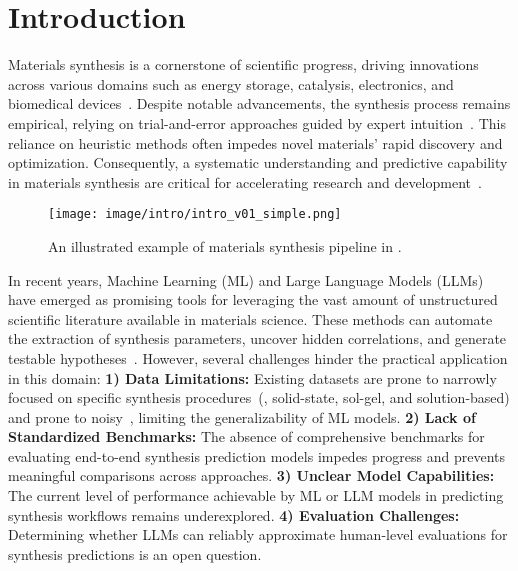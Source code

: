 \section{Introduction}
\label{sec:intro}

Materials synthesis is a cornerstone of scientific progress, driving innovations across various domains such as energy storage, catalysis, electronics, and biomedical devices~\cite{olivetti2020data}. Despite notable advancements, the synthesis process remains empirical, relying on trial-and-error approaches guided by expert intuition~\cite{merchant2023scaling}. This reliance on heuristic methods often impedes novel materials' rapid discovery and optimization. Consequently, a systematic understanding and predictive capability in materials synthesis are critical for accelerating research and development~\cite{huang2023application}.

\begin{figure}[!ht]
    \centering
    \texttt{[image: image/intro/intro\_v01\_simple.png]}
    \caption{An illustrated example of materials synthesis pipeline in \oursbench.}
    \label{fig:intro}
\end{figure}


In recent years, Machine Learning (ML) and Large Language Models (LLMs) have emerged as promising tools for leveraging the vast amount of unstructured scientific literature available in materials science. These methods can automate the extraction of synthesis parameters, uncover hidden correlations, and generate testable hypotheses~\cite{song2023matsci,dunn2020benchmarking}. However, several challenges hinder the practical application in this domain: \textbf{1) Data Limitations:} Existing datasets are prone to narrowly focused on specific synthesis procedures~(\eg, solid-state, sol-gel, and solution-based) and prone to noisy~\cite{sun2025critical}, limiting the generalizability of ML models.
\textbf{2) Lack of Standardized Benchmarks:} The absence of comprehensive benchmarks for evaluating end-to-end synthesis prediction models impedes progress and prevents meaningful comparisons across approaches.
\textbf{3) Unclear Model Capabilities:} The current level of performance achievable by ML or LLM models in predicting synthesis workflows remains underexplored.
\textbf{4) Evaluation Challenges:} Determining whether LLMs can reliably approximate human-level evaluations for synthesis predictions is an open question.

